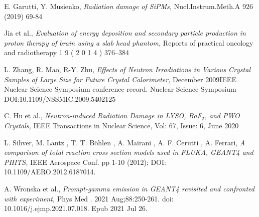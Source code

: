 \documentclass[11pt,a4paper]{article}
\begin{document}
\begin{thebibliography}{9}
E. Garutti, Y. Musienko,  \emph{Radiation damage of SiPMs,}  Nucl.Instrum.Meth.A 926 (2019) 69-84

Jia et al.,  \emph{Evaluation of energy deposition and secondary particle production in proton therapy of brain using a slab head phantom,} Reports of practical oncology and radiotherapy 1 9 ( 2 0 1 4 ) 376–384

L. Zhang, R. Mao, R-Y. Zhu,  \emph{Effects of Neutron Irradiations in Various Crystal Samples of Large Size for Future Crystal Calorimeter,} December 2009IEEE Nuclear Science Symposium conference record. Nuclear Science Symposium
DOI:10.1109/NSSMIC.2009.5402125

C. Hu  et al., \emph{Neutron-induced Radiation  Damage in LYSO, BaF$_2$, and PWO Crystals,} IEEE Transactions in Nuclear Science, Vol: 67, Issue: 6, June 2020


L. Sihver, M. Lantz , T. T. B\"{o}hlen , A. Mairani , A. F. Cerutti , A. Ferrari,  \emph{A comparison of total reaction cross section models used in FLUKA, GEANT4 and PHITS,} IEEE Aerospace Conf. pp 1-10 (2012); DOI: 10.1109/AERO.2012.6187014.

A. Wronska et al.,  \emph{Prompt-gamma emission in GEANT4 revisited and confronted with experiment,} Phys Med
. 2021 Aug;88:250-261.  doi: 10.1016/j.ejmp.2021.07.018.  Epub 2021 Jul 26.

\end{thebibliography}
\end{document}
